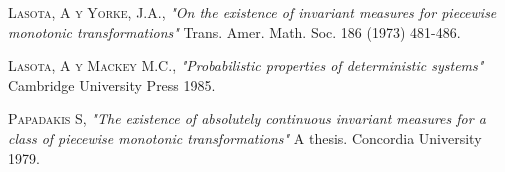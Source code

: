\documentclass{report}
\begin{document}

%
%

\tableofcontents











\begin{thebibliography}{a}
 \textsc{Lasota, A y Yorke, J.A.},
\textit{"On the existence of invariant measures for piecewise monotonic transformations"}
Trans. Amer. Math. Soc. 186 (1973) 481-486.  

 \textsc{Lasota, A y Mackey M.C.},
\textit{"Probabilistic properties of deterministic systems"}
Cambridge University Press 1985.

 \textsc{Papadakis S},
\textit{"The existence of absolutely continuous invariant measures for a class of piecewise monotonic transformations"}
A thesis. Concordia University 1979.
 
\end{thebibliography}
\end{document}
